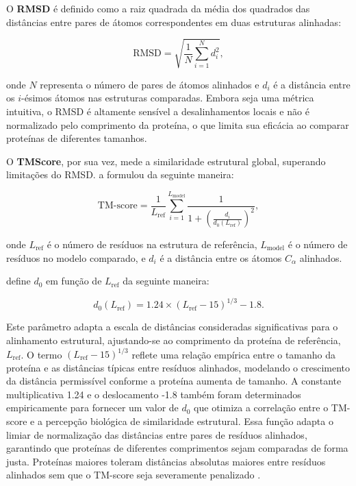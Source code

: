 O \textbf{RMSD} é definido como a raiz quadrada da média dos quadrados das distâncias 
entre pares de átomos correspondentes em duas estruturas alinhadas:

\begin{equation}
    \text{RMSD} = \sqrt{\frac{1}{N} \sum_{i=1}^{N} d_i^2},
\end{equation}

onde \(N\) representa o número de pares de átomos alinhados e \(d_i\) é a distância entre os \(i\)-ésimos átomos nas estruturas comparadas. 
Embora seja uma métrica intuitiva, o RMSD é altamente sensível a desalinhamentos locais e não é normalizado pelo comprimento da proteína,
o que limita sua eficácia ao comparar proteínas de diferentes tamanhos.

O \textbf{TMScore}, por sua vez,
mede a similaridade estrutural global, superando limitações do RMSD. \cite{tmscore} a formulou da seguinte maneira:

\begin{equation}
    \text{TM-score} = \frac{1}{L_{\text{ref}}} \sum_{i=1}^{L_{\text{model}}} \frac{1}{1 + \left(\frac{d_i}{d_0(L_{\text{ref}})}\right)^2},
\end{equation}

onde \(L_{\text{ref}}\) é o número de resíduos na estrutura de referência,
 \(L_{\text{model}}\) é o número de resíduos no modelo comparado, 
 e \(d_i\) é a distância entre os átomos \(C_\alpha\) alinhados. 
 
 \cite{tmscore} define \(d_0\) em função de \(L_{\text{ref}}\) da seguinte maneira:

\begin{equation}
    d_0(L_{\text{ref}}) = 1.24 \times (L_{\text{ref}} - 15)^{1/3} - 1.8.
\end{equation}

Este parâmetro adapta a escala de distâncias consideradas significativas para o alinhamento estrutural,
ajustando-se ao comprimento da proteína de referência, \( L_{\text{ref}} \). 
O termo \( (L_{\text{ref}} - 15)^{1/3} \) 
reflete uma relação empírica entre o tamanho da proteína e as distâncias típicas entre resíduos alinhados,
modelando o crescimento da distância permissível conforme a proteína aumenta de tamanho.
A constante multiplicativa 1.24 e o deslocamento -1.8 também foram determinados empiricamente para fornecer 
um valor de \( d_0 \) que otimiza a correlação entre o TM-score e a percepção biológica de similaridade estrutural.
Essa função adapta o limiar de normalização das distâncias entre pares de resíduos alinhados,
garantindo que proteínas de diferentes comprimentos sejam comparadas de forma justa.
Proteínas maiores toleram distâncias absolutas maiores entre resíduos alinhados sem que o TM-score seja severamente penalizado \cite{tmscore}.
 

